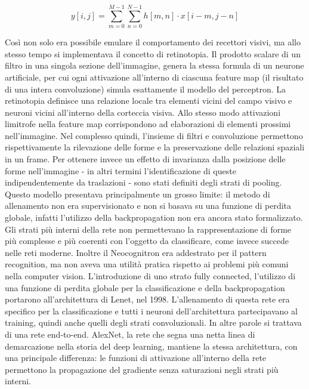 \begin{equation} \label{eq:convolution2D}
y[i,j] = \sum_{m=0}^{M-1} \sum_{n=0}^{N-1} h[m,n] \cdot x[i - m, j - n]
\end{equation}


\noindent Così non solo era possibile emulare il comportamento dei recettori visivi, ma allo stesso tempo si implementava il concetto di retinotopia. Il prodotto scalare di un filtro in una singola sezione dell'immagine, genera la stessa formula di un neurone artificiale, per cui ogni attivazione all'interno di ciascuna feature map (il risultato di una intera convoluzione) simula esattamente il modello del perceptron. La retinotopia definisce una relazione locale tra elementi vicini del campo visivo e neuroni vicini all'interno della corteccia visiva. Allo stesso modo attivazioni limitrofe nella feature map corrispondono ad elaborazioni di elementi prossimi nell'immagine. Nel complesso quindi, l'insieme di filtri e convoluzione permettono rispettivamente la rilevazione delle forme e la preservazione delle relazioni spaziali in un frame. Per ottenere invece un effetto di invarianza dalla posizione delle forme nell'immagine - in altri termini l'identificazione di queste indipendentemente da traslazioni - sono stati definiti degli strati di pooling. Questo modello presentava principalmente un grosso limite: il metodo di allenamento non era supervisionato e non si basava su una funzione di perdita globale, infatti l'utilizzo della backpropagation non era ancora stato formalizzato. Gli strati più interni della rete non permettevano la rappresentazione di forme più complesse e più coerenti con l'oggetto da classificare, come invece succede nelle reti moderne. Inoltre il Neocognitron era addestrato per il pattern recognition, ma non aveva una utilità pratica rispetto ai problemi più comuni nella computer vision. L'introduzione di uno strato fully connected, l'utilizzo di una funzione di perdita globale per la classificazione e della backpropagation portarono all'architettura di Lenet, nel 1998. L'allenamento di questa rete era specifico per la classificazione e tutti i neuroni dell'architettura partecipavano al training, quindi anche quelli degli strati convoluzionali. In altre parole si trattava di una rete end-to-end. AlexNet, la rete che segna una netta linea di demarcazione nella storia del deep learning, mantiene la stessa architettura, con una principale differenza: le funzioni di attivazione all'interno della rete permettono la propagazione del gradiente senza saturazioni negli strati più interni. 

